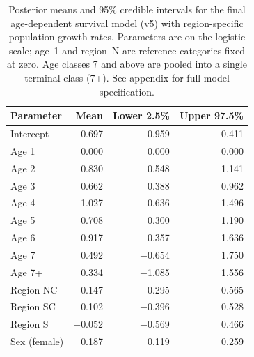 
\begin{table}[!htbp]
  \centering
  \captionsetup{font=scriptsize}
  \caption{Posterior means and 95\% credible intervals for the final
    age-dependent survival model (v5) with region-specific population
    growth rates. Parameters are on the logistic scale; age~1 and
    region~N are reference categories fixed at zero. Age classes 7 and
    above are pooled into a single terminal class (7+). See appendix
    for full model specification.}
  \label{table:param}
  \scriptsize
  \begin{tabular}{lrrr}
    \toprule
    Parameter    & Mean     & Lower 2.5\% & Upper 97.5\% \\
    \midrule
    Intercept    & $-$0.697 & $-$0.959    & $-$0.411     \\
    \midrule
    Age 1        & 0.000    & 0.000       & 0.000        \\
    Age 2        & 0.830    & 0.548       & 1.141        \\
    Age 3        & 0.662    & 0.388       & 0.962        \\
    Age 4        & 1.027    & 0.636       & 1.496        \\
    Age 5        & 0.708    & 0.300       & 1.190        \\
    Age 6        & 0.917    & 0.357       & 1.636        \\
    Age 7        & 0.492    & $-$0.654    & 1.750        \\
    Age 7+       & 0.334    & $-$1.085    & 1.556        \\
    \midrule
    Region NC    & 0.147    & $-$0.295    & 0.565        \\
    Region SC    & 0.102    & $-$0.396    & 0.528        \\
    Region S     & $-$0.052 & $-$0.569    & 0.466        \\
    \midrule
    Sex (female) & 0.187    & 0.119       & 0.259        \\
    \bottomrule
  \end{tabular}
\end{table}

